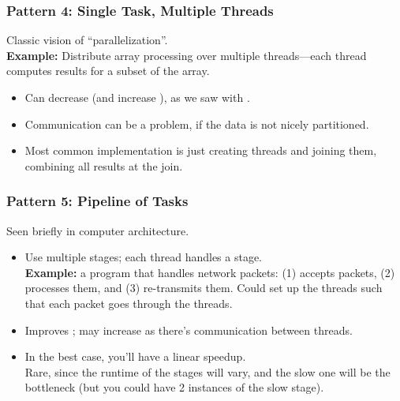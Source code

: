 \begin{frame}
  \frametitle{Pattern 4: Single Task, Multiple Threads}

  
  Classic vision of ``parallelization''.\\[1em]

  {\bf Example:} Distribute array processing over multiple 
      threads---each thread computes results for a subset of the array.

  \begin{itemize}
    \item Can decrease  (and increase
      ), as we saw with .
    \item Communication can be a problem, if the data is not nicely partitioned.
    \item Most common implementation is just creating threads and joining them,
      combining all results at the join.
  \end{itemize}
  
\end{frame}

\begin{frame}
  \frametitle{Pattern 5: Pipeline of Tasks}

  
    Seen briefly in computer architecture.

    \begin{itemize}
    \item Use multiple stages; each thread handles a stage.\\[1em]
     {\bf Example:} a program that handles network packets: (1) accepts
      packets, (2) processes them, and (3) re-transmits them. Could set up the threads such that each packet goes through the threads.
    \vfill
    \item Improves ; may increase  as
      there's communication between threads.
    \vfill
    \item In the best case, you'll have a linear speedup.\\[1em]

     Rare, since the runtime of the stages will vary, and the slow
      one will be the bottleneck (but you could have 2 instances of the
      slow stage).
  \end{itemize}
  
\end{frame}

